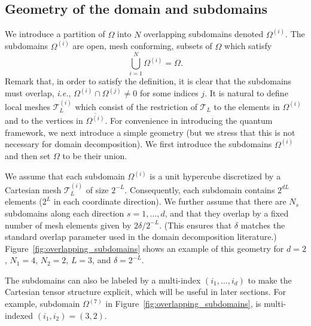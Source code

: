 \documentclass[onefignum,onetabnum]{siamart251216}
\begin{document}
\subsection{Geometry of the domain and subdomains}
\label{sec:geom}
We introduce a partition of $\Omega$ into $N$ overlapping subdomains denoted $\Omega^{(i)}$. The subdomains $\Omega^{(i)}$ are open, mesh conforming, subsets of $\Omega$ which satisfy
\[
\bigcup\limits_{i=1}^N \Omega^{(i)} = \Omega. 
\]
Remark that, in order to satisfy the definition, it is clear that the subdomains must overlap, \textit{i.e.}, $\Omega^{(i)} \cap \Omega^{(j)} \neq 0$ for some indices $j$. It is natural to define local meshes $\mathcal{T}_L^{(i)}$ which consist of the restriction of $\mathcal{T}_L$ to the elements in $\Omega^{(i)}$ and to the vertices in $\overline{\Omega^{(i)}}$. For convenience in introducing the quantum framework, we next introduce a simple geometry (but we stress that this is not necessary for domain decomposition). We first introduce the subdomains $\Omega^{(i)}$ and then set $\Omega$ to be their union. 

We assume that each subdomain $\Omega^{(i)}$ is a unit hypercube discretized by a Cartesian mesh  $\mathcal{T}_L^{(i)}$ of size $2^{-L}$. Consequently, each subdomain contains $2^{dL}$ elements ($2^L$ in each coordinate direction). We further assume that there are $N_s$ subdomains along each direction $s= 1, \dots, d$, and that they overlap by a fixed number of mesh elements given by $2 \delta / 2^{-L}$. (This ensures that $\delta$ matches the standard overlap parameter used in the domain decomposition literature.) Figure~\ref{fig:overlapping_subdomains} shows an example of this geometry for $d=2$, $N_1 = 4$, $N_2 = 2$, $L = 3$, and $\delta = 2^{-L}$.

\begin{remark}
\label{rem:i-multiindex}
The subdomains can also be labeled by a multi-index $(i_1,\dots,i_d)$ to make the Cartesian tensor structure explicit, which will be useful in later sections. For example, subdomain $\Omega^{(7)}$ in Figure~\ref{fig:overlapping_subdomains}, is multi-indexed $(i_1, i_2) = (3,2)$. 
\end{remark}
\end{document}
